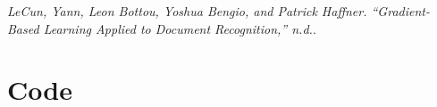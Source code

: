 \documentclass[11pt]{article}
\theoremstyle{definition}
\newcommand*{\oneup}{..}%
\begin{document}
\newpage
\begin{thebibliography}{999}

  \emph{LeCun, Yann, Leon Bottou, Yoshua Bengio, and Patrick Haffner. “Gradient-Based Learning Applied to Document Recognition,” n.d.}.

	
\end{thebibliography}

\newpage
\section*{Code}


%
%
%
%
%
%
%
%
%
%
%
\end{document}
